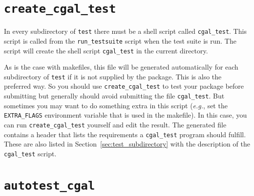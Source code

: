 \section{{\tt create\_cgal\_test}}
\label{sec:create_cgal_test}

In every subdirectory of {\tt test} there must be a shell script called
{\tt cgal\_test}. This script is called from the {\tt run\_testsuite}%
script when the test suite is run. The script 
will create the shell script {\tt cgal\_test} in the current directory.

As is the case with makefiles, this file will be generated automatically for
each subdirectory of {\tt test} if
it is not supplied by the package. This is also the preferred way.
So you should use {\tt create\_cgal\_test} to test your package before 
submitting but generally should avoid submitting the file {\tt cgal\_test}.
But sometimes you may want to do something extra in this script ({\em e.g.}, set
the {\tt EXTRA\_FLAGS}
environment variable that is used in the makefile).
In this case, you can run {\tt create\_cgal\_test} yourself and edit the result.
The generated file contains a header that lists the requirements a
{\tt cgal\_test} program should fulfill. These are also listed in
Section~\ref{sec:test_subdirectory} with the description of the 
{\tt cgal\_test} script.


\section{{\tt autotest\_cgal}}
\label{sec:autotest_cgal}

